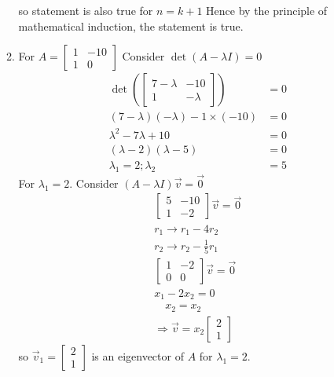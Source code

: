 \documentclass[11pt]{article}
\begin{document}
\begin{enumerate}[{\bf Q1.}]
\begin{enumerate}
$$			$$
			so statement is also true for $n=k+1$
			\newline Hence by the principle of mathematical induction, the statement is true.
			\item 
			For $A=\left[\begin{array}{cc}1 & -10 \\ 1 & 0\end{array}\right]$
			\newline Consider $\operatorname{det}(A-\lambda I)=0$
			$$
			\begin{aligned}
			\operatorname{det}\left(\left[\begin{array}{cc}
			7-\lambda & -10 \\
			1 & -\lambda
			\end{array}\right]\right) & =0 \\
			(7-\lambda)(-\lambda)-1 \times(-10) & =0 \\
			\lambda^2-7 \lambda+10 & =0 \\
			(\lambda-2)(\lambda-5) & =0 \\
			\lambda_1=2 ; \lambda_2 & =5
			\end{aligned}
			$$
			For $\lambda_1=2$. \newline
			Consider $(A-\lambda I) \vec{v}=\overrightarrow{0}$
			$$
			\begin{gathered}
			{\left[\begin{array}{cc}
			5 & -10 \\
			1 & -2
			\end{array}\right] \vec{v}=\overrightarrow{0}} \\
			r_1 \rightarrow r_1-4 r_2 \\
			r_2 \rightarrow r_2-\frac{1}{5} r_1 \\
			{\left[\begin{array}{cc}
			1 & -2 \\
			0 & 0
			\end{array}\right] \vec{v}=\overrightarrow{0}} \\
			x_1-2 x_2=0 \\
			\quad x_2=x_2 \\
			\Rightarrow \vec{v}=x_2\left[\begin{array}{l}
			2 \\
			1
			\end{array}\right]
			\end{gathered}
			$$
			so $\vec{v}_1=\left[\begin{array}{l}2 \\ 1\end{array}\right]$ is an eigenvector of $A$ for $\lambda_1=2$.

\end{enumerate}
\end{enumerate}
\end{document}
